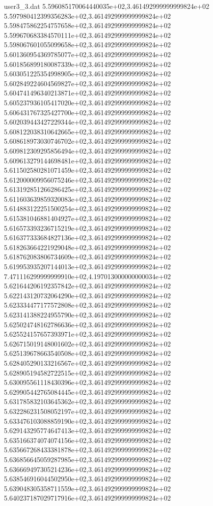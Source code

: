 \begin{filecontents}{user3_3.dat}
5.596085170064440035e+02,3.461492999999999824e+02
5.597980412399356283e+02,3.461492999999999824e+02
5.598475862254757658e+02,3.461492999999999824e+02
5.599670683384570111e+02,3.461492999999999824e+02
5.598067601055099658e+02,3.461492999999999824e+02
5.601360954369785077e+02,3.461492999999999824e+02
5.601856899180087339e+02,3.461492999999999824e+02
5.603051225354998905e+02,3.461492999999999824e+02
5.602849224604569827e+02,3.461492999999999824e+02
5.604741496340213871e+02,3.461492999999999824e+02
5.605237936105417020e+02,3.461492999999999824e+02
5.606431767325427700e+02,3.461492999999999824e+02
5.602039443427229344e+02,3.461492999999999824e+02
5.608122038310642665e+02,3.461492999999999824e+02
5.608618973030746702e+02,3.461492999999999824e+02
5.609812309295856494e+02,3.461492999999999824e+02
5.609613279144698481e+02,3.461492999999999824e+02
5.611502580281071459e+02,3.461492999999999824e+02
5.612000009956075246e+02,3.461492999999999824e+02
5.613192851266286425e+02,3.461492999999999824e+02
5.611603639859320083e+02,3.461492999999999824e+02
5.614883122251500254e+02,3.461492999999999824e+02
5.615381046881404927e+02,3.461492999999999824e+02
5.616573393236715219e+02,3.461492999999999824e+02
5.616377333684827136e+02,3.461492999999999824e+02
5.618263664221929048e+02,3.461492999999999824e+02
5.618762083806734609e+02,3.461492999999999824e+02
5.619953935207144013e+02,3.461492999999999824e+02
7.471116299999999910e+02,4.197013000000000034e+02
5.621644206192357842e+02,3.461492999999999824e+02
5.622143120732064290e+02,3.461492999999999824e+02
5.623334477177572808e+02,3.461492999999999824e+02
5.623141388224955790e+02,3.461492999999999824e+02
5.625024748162786636e+02,3.461492999999999824e+02
5.625524157657393971e+02,3.461492999999999824e+02
5.626715019148001602e+02,3.461492999999999824e+02
5.625139678663540508e+02,3.461492999999999824e+02
5.628405290133216567e+02,3.461492999999999824e+02
5.628905194582722515e+02,3.461492999999999824e+02
5.630095561118430396e+02,3.461492999999999824e+02
5.629905442765084445e+02,3.461492999999999824e+02
5.631785832103645362e+02,3.461492999999999824e+02
5.632286231508052197e+02,3.461492999999999824e+02
5.633476103088859190e+02,3.461492999999999824e+02
5.629143295774647413e+02,3.461492999999999824e+02
5.635166374074074156e+02,3.461492999999999824e+02
5.635667268433381878e+02,3.461492999999999824e+02
5.636856645059287985e+02,3.461492999999999824e+02
5.636669497305214236e+02,3.461492999999999824e+02
5.638546916044502950e+02,3.461492999999999824e+02
5.639048305358711559e+02,3.461492999999999824e+02
5.640237187029717916e+02,3.461492999999999824e+02

\end{filecontents}
